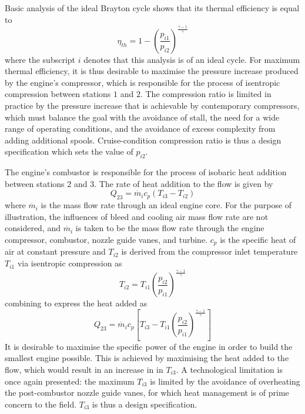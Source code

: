 \documentclass[a4paper, 11pt, oneside]{report}
\begin{document}
Basic analysis of the ideal Brayton cycle shows that its thermal efficiency is equal to
\begin{equation}
	\eta_{th} = 
	1 - 
	\left(
		\frac{p_{i1}}{p_{i2}}
	\right)
	^
	\frac{\gamma-1}{\gamma}
\end{equation}
where the subscript $i$ denotes that this analysis is of an ideal cycle. For maximum thermal efficiency, it is thus desirable to maximise the pressure increase produced by the engine's compressor, which is responsible for the process of isentropic compression between stations $1$ and $2$. The compression ratio is limited in practice by the pressure increase that is achievable by contemporary compressors, which must balance the goal with the avoidance of stall, the need for a wide range of operating conditions, and the avoidance of excess complexity from adding additional spools. Cruise-condition compression ratio is thus a design specification which sets the value of $p_{i2}$.

The engine's combustor is responsible for the process of isobaric heat addition between stations $2$ and $3$. The rate of heat addition to the flow is given by
\begin{equation}
	Q_{23} = 
	\dot{m_i}
	c_p
	\left(
		T_{i3} - T_{i2}
	\right)
\end{equation}
where $\dot{m_i}$ is the mass flow rate through an ideal engine core. For the purpose of illustration, the influences of bleed and cooling air mass flow rate are not considered, and $\dot{m_i}$ is taken to be the mass flow rate through the engine compressor, combustor, nozzle guide vanes, and turbine. $c_p$ is the specific heat of air at constant pressure and $T_{i2}$ is derived from the compressor inlet temperature $T_{i1}$ via isentropic compression as
\begin{equation}
	T_{i2} = 
	T_{i1}
	\left(
		\frac{p_{i2}}{p_{i1}}
	\right)
	^
	\frac{\gamma-1}{\gamma}
\end{equation}
combining to express the heat added as
\begin{equation}
	Q_{23} = 
	\dot{m_i}
	c_p
	\left[
		T_{i3} - 
		T_{i1}
		\left(
			\frac{p_{i2}}{p_{i1}}
		\right)
		^
		\frac{\gamma-1}{\gamma}
	\right]
\end{equation}
It is desirable to maximise the specific power of the engine in order to build the smallest engine possible. This is achieved by maximising the heat added to the flow, which would result in an increase in in $T_{i3}$. A technological limitation is once again presented: the maximum $T_{i3}$ is limited by the avoidance of overheating the post-combustor nozzle guide vanes, for which heat management is of prime concern to the field. $T_{i3}$ is thus a design specification.
\end{document}

